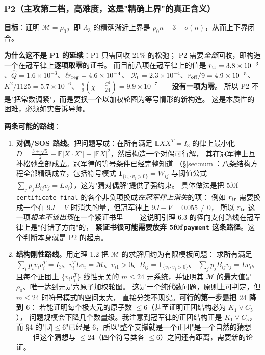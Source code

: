 \documentclass[UTF8,11pt]{ctexart}
\theoremstyle{definition}
\newcommand{\E}{\mathbb{E}}
\newcommand{\peq}[1]{\textup{\u5f0f}\,\texttt{#1}}
\begin{document}
\subsubsection*{P2（主攻第二档，高难度，这是"精确上界"的真正含义）}
\textbf{目标}：证明 $\mathcal M=\rho_0$，即 $\Lambda_3$ 的精确渐近上界是
$\rho_0 n-3+o(n)$，从而上下界闭合。

\textbf{为什么这不是 P1 的延续}：P1 只需回收 $21\%$ 的松弛；
P2 需要\emph{全部}回收，即构造一个在冠军律上\textbf{逐项取零}的证书。
而目前八项在冠军律上的值是
$r_{\rm tr}=3.8\times10^{-3}$、$\widehat Q=1.6\times10^{-3}$、$\ell r_{\rm reg}=4.6\times10^{-4}$、
$\mathcal R_0=2.3\times10^{-4}$、$r_{\rm off}/9=4.9\times10^{-5}$、$K^2/1125=5.7\times10^{-6}$、
$\frac\kappa9(\chi-\frac{C^2}{24})=9.9\times10^{-7}$——\textbf{没有一项为零}。
所以 P2 不是"把常数调紧"，而是要换一个以加权轮图为等号情形的新构造。
这是本质性的困难，必须如实告诉导师。

\textbf{两条可能的路线}：
\begin{enumerate}[leftmargin=1.8em,itemsep=3pt]
\item \textbf{对偶/SOS 路线}。把问题写成：在所有满足 $\E XX^T=I_3$ 的律上最小化
$D=\frac{3+\sqrt5}2-\E|X\cdot X'|-|\E X|^2$，然后构造一个对偶可行解，
其在冠军律上互补松弛全部成立。冠军律的等号条件已经完整知道
（\S\ref{sec:num}：八条结构方程全部精确成立，包括符号模式 $\mathbf1_{\{v_i\cdot v_j>0\}}=W_{ij}$
与阈值公式 $\sum_jp_jB_{ij}v_j=Lv_i$），这为"猜对偶解"提供了强约束。
具体做法是把 \peq{certificate-final} 的各个非负项换成\emph{在冠军律上消失}的项：
例如 $r_{\rm tr}$ 需要换成一个在 $9J=V$ 时消失的量，但冠军律上 $9J-V=0.055\ne0$，
所以 $r_{\rm tr}$ 这一项\emph{根本不该出现}在一个紧证书里——
这说明引理 6.3 的径向支付路线在冠军律上是"付错了方向"的，
\textbf{紧证书很可能需要放弃 \peq{payment} 这条路径}。这个判断本身就是 P2 的起点。
\item \textbf{结构刚性路线}。用定理 1.2 把 $\mathcal M$ 的求解归约为有限模板问题：
求所有满足
$\sum_ip_iv_iv_i^T=I_3$、$v_i^TLv_i=\mathcal M$、$v_{i1}>0$、$B_{ij}=\mathbf1_{\{v_i\cdot v_j>0\}}$、
$\sum_jp_jB_{ij}v_j=Lv_i$、且每个正团上 $\{v_iv_i^T\}$ 线性无关的
$m\le24$ 元系统，并证明其 $\mathcal M$ 的最大值是 $\rho_0$、唯一达到元是六原子加权轮图。
这是一个纯代数问题，原则上可判定，但 $m\le24$ 时符号模式的空间太大，
直接分类不现实。\textbf{可行的第一步是把 $24$ 降到 $6$}：
若能证明每个极大元的原子数 $\le6$（甚至证明正团结构必为 $K_1\vee C_5$），
问题规模会下降几个数量级。我注意到冠军律的正团结构正是 $K_1\vee C_5$，
而 \S4 的"$|J|\le6$"已经是 $6$，所以"整个支撑就是一个正团"是一个自然的猜想——
但这个猜想与 $\le24$（四个符号类各 $\le6$）之间还有距离，需要新的论证。
\end{enumerate}
\end{document}
